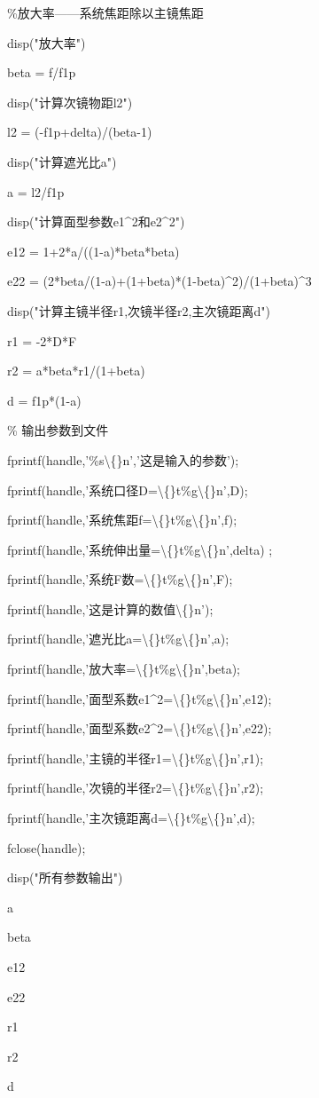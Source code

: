 		\%放大率——系统焦距除以主镜焦距
		
		disp("放大率")
		
		beta = f/f1p
		
		disp("计算次镜物距l2")
		
		l2 = (-f1p+delta)/(beta-1)
		
		disp("计算遮光比a")
		
		a =  l2/f1p
		
		disp("计算面型参数e1\^{}2和e2\^{}2")
		
		e12 = 1+2*a/((1-a)*beta*beta)
		
		e22 = (2*beta/(1-a)+(1+beta)*(1-beta)\^{}2)/(1+beta)\^{}3
		
		disp("计算主镜半径r1,次镜半径r2,主次镜距离d")
		
		r1 = -2*D*F
		
		r2 = a*beta*r1/(1+beta)
		
		d = f1p*(1-a)
		
		\% 输出参数到文件
		
		fprintf(handle,'\%s\textbackslash\{\}n','这是输入的参数');
		
		fprintf(handle,'系统口径D=\textbackslash\{\}t\%g\textbackslash\{\}n',D);
		
		fprintf(handle,'系统焦距f=\textbackslash\{\}t\%g\textbackslash\{\}n',f);
		
		fprintf(handle,'系统伸出量=\textbackslash\{\}t\%g\textbackslash\{\}n',delta)
		;
		
		fprintf(handle,'系统F数=\textbackslash\{\}t\%g\textbackslash\{\}n',F);
		
		
		fprintf(handle,'这是计算的数值\textbackslash\{\}n');
		
		fprintf(handle,'遮光比a=\textbackslash\{\}t\%g\textbackslash\{\}n',a);
		
		fprintf(handle,'放大率=\textbackslash\{\}t\%g\textbackslash\{\}n',beta);
		
		fprintf(handle,'面型系数e1\^{}2=\textbackslash\{\}t\%g\textbackslash\{\}n',e12);
		
		fprintf(handle,'面型系数e2\^{}2=\textbackslash\{\}t\%g\textbackslash\{\}n',e22);
		
		fprintf(handle,'主镜的半径r1=\textbackslash\{\}t\%g\textbackslash\{\}n',r1);
		
		fprintf(handle,'次镜的半径r2=\textbackslash\{\}t\%g\textbackslash\{\}n',r2);
		
		fprintf(handle,'主次镜距离d=\textbackslash\{\}t\%g\textbackslash\{\}n',d);
		
		fclose(handle);
		
		disp("所有参数输出")
		
		a 
		
		beta 
		
		e12
		
		e22
		
		r1 
		
		r2 
		
		d 



